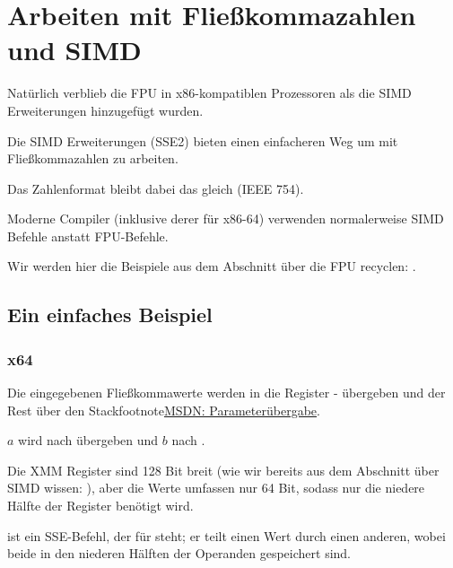 \section{Arbeiten mit Fließkommazahlen und SIMD}

\label{floating_SIMD}
Natürlich verblieb die \ac{FPU} in x86-kompatiblen Prozessoren als die \ac{SIMD} Erweiterungen hinzugefügt wurden.

Die \ac{SIMD} Erweiterungen (SSE2) bieten einen einfacheren Weg um mit Fließkommazahlen zu arbeiten.

Das Zahlenformat bleibt dabei das gleich (IEEE 754).

Moderne Compiler (inklusive derer für x86-64) verwenden normalerweise \ac{SIMD} Befehle anstatt FPU-Befehle.

Wir werden hier die Beispiele aus dem Abschnitt über die FPU recyclen: .

\subsection{Ein einfaches Beispiel}



\subsubsection{x64}


Die eingegebenen Fließkommawerte werden in die Register - übergeben und der Rest über den
Stackfootnote{\href{http://go.yurichev.com/17263}{MSDN: Parameterübergabe}}.

$a$ wird nach  übergeben und $b$ nach .

Die XMM Register sind 128 Bit breit (wie wir bereits aus dem Abschnitt über \ac{SIMD} wissen: ), aber
die \Tdouble Werte umfassen nur 64 Bit, sodass nur die niedere Hälfte der Register benötigt wird.

 ist ein SSE-Befehl, der für  
 steht;
er teilt einen \Tdouble Wert durch einen anderen, wobei beide in den niederen Hälften der Operanden gespeichert sind. 

